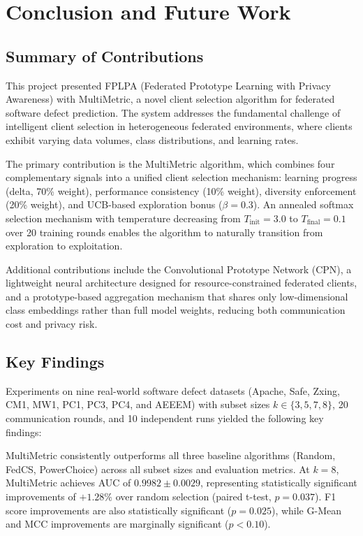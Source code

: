 \chapter{Conclusion and Future Work}

\section{Summary of Contributions}

This project presented FPLPA (Federated Prototype Learning with Privacy Awareness) with MultiMetric, a novel client selection algorithm for federated software defect prediction. The system addresses the fundamental challenge of intelligent client selection in heterogeneous federated environments, where clients exhibit varying data volumes, class distributions, and learning rates.

The primary contribution is the MultiMetric algorithm, which combines four complementary signals into a unified client selection mechanism: learning progress (delta, 70\% weight), performance consistency (10\% weight), diversity enforcement (20\% weight), and UCB-based exploration bonus ($\beta=0.3$). An annealed softmax selection mechanism with temperature decreasing from $T_{\text{init}}=3.0$ to $T_{\text{final}}=0.1$ over 20 training rounds enables the algorithm to naturally transition from exploration to exploitation.

Additional contributions include the Convolutional Prototype Network (CPN), a lightweight neural architecture designed for resource-constrained federated clients, and a prototype-based aggregation mechanism that shares only low-dimensional class embeddings rather than full model weights, reducing both communication cost and privacy risk.

\section{Key Findings}

Experiments on nine real-world software defect datasets (Apache, Safe, Zxing, CM1, MW1, PC1, PC3, PC4, and AEEEM) with subset sizes $k \in \{3, 5, 7, 8\}$, 20 communication rounds, and 10 independent runs yielded the following key findings:

MultiMetric consistently outperforms all three baseline algorithms (Random, FedCS, PowerChoice) across all subset sizes and evaluation metrics. At $k=8$, MultiMetric achieves AUC of $0.9982 \pm 0.0029$, representing statistically significant improvements of $+1.28\%$ over random selection (paired t-test, $p=0.037$). F1 score improvements are also statistically significant ($p=0.025$), while G-Mean and MCC improvements are marginally significant ($p<0.10$).

